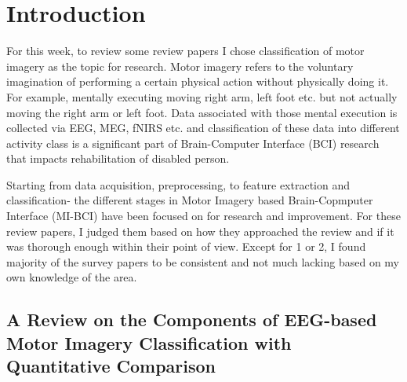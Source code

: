 \maketitle

\section*{Introduction}
For this week, to review some review papers I chose classification of motor imagery as the topic for research. Motor imagery refers to the voluntary imagination of performing a certain physical action without physically doing it. For example, mentally executing moving right arm, left foot etc. but not actually moving the right arm or left foot. Data associated with those mental execution is collected via EEG, MEG, fNIRS etc. and classification of these data into different activity class is a significant part of Brain-Computer Interface (BCI) research that impacts rehabilitation of disabled person. 

Starting from data acquisition, preprocessing, to feature extraction and classification- the different stages in Motor Imagery based Brain-Copmputer Interface (MI-BCI) have been focused on for research and improvement. For these review papers, I judged them based on how they approached the review and if it was thorough enough within their point of view. Except for 1 or 2, I found majority of the survey papers to be consistent and not much lacking based on my own knowledge of the area.\\

\subsection*{A Review on the Components of EEG-based Motor Imagery Classification with Quantitative Comparison}\cite{rahman_review_2017}

